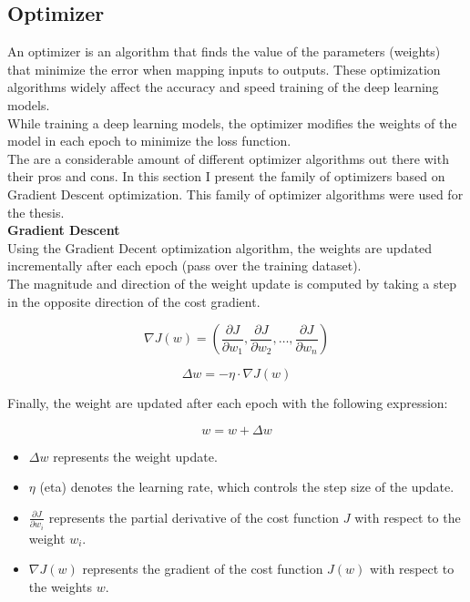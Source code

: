 \subsection{Optimizer}

An optimizer is an algorithm that finds the value of the parameters (weights) that minimize the error when mapping inputs to outputs. These optimization algorithms widely affect the accuracy and speed training of the deep learning models. \\

While training a deep learning models, the optimizer modifies the weights of the model in each epoch to minimize the loss function. \\

The are a considerable amount of different optimizer algorithms out there with their pros and cons. In this section I present the family of optimizers based on Gradient Descent optimization. This family of optimizer algorithms were used for the thesis. \\

\vspace{0.5cm}
\textbf{Gradient Descent} \\

Using the Gradient Decent optimization algorithm, the weights are updated incrementally after each epoch (pass over the training dataset). \\

The magnitude and direction of the weight update is computed by taking a step in the opposite direction of the cost gradient.

\[\nabla J(w) = (\frac{\partial J}{\partial w_1}, \frac{\partial J}{\partial w_2}, \ldots, \frac{\partial J}{\partial w_n})\]

\[
\Delta w = -\eta \cdot \nabla J(w)
\]

Finally, the weight are updated after each epoch with the following expression:

\[
w = w + \Delta w 
\]


\begin{itemize}
    \item \(\Delta w\) represents the weight update.
    \item \(\eta\) (eta) denotes the learning rate, which controls the step size of the update.
    \item  \(\frac{\partial J}{\partial w_i}\) represents the partial derivative of the cost function \(J\) with respect to the weight \(w_i\).
    \item \(\nabla J(w)\) represents the gradient of the cost function \(J(w)\) with respect to the weights \(w\).
\end{itemize}

